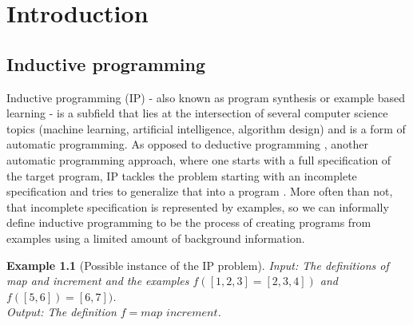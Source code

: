   {\topsep}{\topsep}%
  {}{}%
  {\bfseries}{}%
  {\newline}{}%
\theoremstyle{indented}
\newtheorem{exam}{Example}

\chapter{Introduction}

\section{Inductive programming}
\indent
\indent Inductive programming (IP) - also known as program synthesis or example based learning - is a subfield that lies at the intersection of several computer science topics (machine learning, artificial intelligence, algorithm design) and is a form of automatic programming. As opposed to deductive programming \cite{deductive}, another automatic programming approach, where one starts with a full specification of the target program, IP tackles the problem starting with an incomplete specification and tries to generalize that into a program \cite{cropperth}. More often than not, that incomplete specification is represented by examples, so we can informally define inductive programming to be the process of creating programs from examples using a limited amount of background information.

\begin{exam}[Possible instance of the IP problem]
\textit{Input}: The definitions of \textit{map} and \textit{increment} and the examples $f([1,2,3] = [2,3,4])$ and $f([5,6]) = [6,7])$.
\\
\textit{Output}: The definition $f = map$ $increment$. %
\end{exam}

